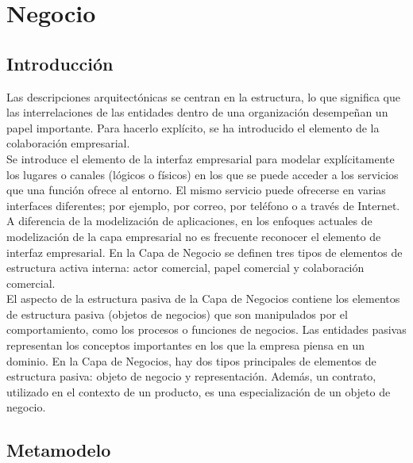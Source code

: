 \chapter{Negocio}
\section{Introducción}
Las descripciones arquitectónicas se centran en la estructura, lo que significa que las interrelaciones de las entidades dentro de una organización desempeñan un papel importante. Para hacerlo explícito, se ha introducido el elemento de la colaboración empresarial.\\

Se introduce el elemento de la interfaz empresarial para modelar explícitamente los lugares o canales (lógicos o físicos) en los que se puede acceder a los servicios que una función ofrece al entorno. El mismo servicio puede ofrecerse en varias interfaces diferentes; por ejemplo, por correo, por teléfono o a través de Internet. A diferencia de la modelización de aplicaciones, en los enfoques actuales de modelización de la capa empresarial no es frecuente reconocer el elemento de interfaz empresarial.
En la Capa de Negocio se definen tres tipos de elementos de estructura activa interna: actor comercial, papel comercial y colaboración comercial.\\

El aspecto de la estructura pasiva de la Capa de Negocios contiene los elementos de estructura pasiva (objetos de negocios) que son manipulados por el comportamiento, como los procesos o funciones de negocios. Las entidades pasivas representan los conceptos importantes en los que la empresa piensa en un dominio.
En la Capa de Negocios, hay dos tipos principales de elementos de estructura pasiva: objeto de negocio y representación. Además, un contrato, utilizado en el contexto de un producto, es una especialización de un objeto de negocio.

\newpage
\section{Metamodelo}


